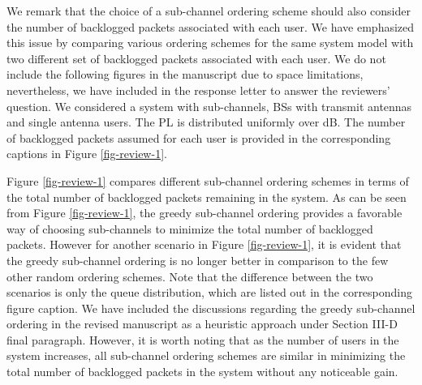 \begin{enumerate}
We remark that the choice of a sub-channel ordering scheme should also consider the number of backlogged packets associated with each user. We have emphasized this issue by comparing various ordering schemes for the same system model with two different set of backlogged packets associated with each user. We do not include the following figures in the manuscript due to space limitations, nevertheless, we have included in the response letter to answer the reviewers' question. We considered a system with  sub-channels,  \acp{BS} with  transmit antennas and  single antenna users. The \ac{PL} is distributed uniformly over \eqn{[0,-3]} dB. The number of backlogged packets assumed for each user is provided in the corresponding captions in Figure \ref{fig-review-1}.

Figure \ref{fig-review-1} compares different sub-channel ordering schemes in terms of the total number of backlogged packets remaining in the system. As can be seen from Figure \ref{fig-review-1}, the greedy sub-channel ordering provides a favorable way of choosing sub-channels to minimize the total number of backlogged packets. However for another scenario in Figure \ref{fig-review-1}, it is evident that the greedy sub-channel ordering is no longer better in comparison to the few other random ordering schemes. Note that the difference between the two scenarios is only the queue distribution, which are listed out in the corresponding figure caption. We have included the discussions regarding the greedy sub-channel ordering in the revised manuscript as a heuristic approach under Section III-D final paragraph. However, it is worth noting that as the number of users in the system increases, all sub-channel ordering schemes are similar in minimizing the total number of backlogged packets in the system without any noticeable gain.

\pagebreak
{} 
	

\end{enumerate}

